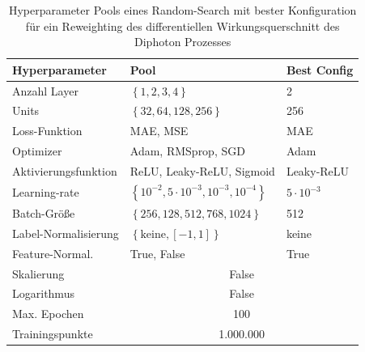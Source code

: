 \begin{table}
	\centering
	\begin{tabular}{|l|l|l|}
		\hline
		Hyperparameter & Pool & Best Config \\
		\hline
		Anzahl Layer & $\left\lbrace 1,2,3,4\right\rbrace$ & 2 \\
		Units &$\left\lbrace 32, 64, 128, 256\right\rbrace$ & 256 \\
		Loss-Funktion & MAE, MSE & MAE \\
		Optimizer & Adam, RMSprop, SGD  & Adam\\
		Aktivierungsfunktion & ReLU, Leaky-ReLU, Sigmoid & Leaky-ReLU \\
		Learning-rate & $\left\lbrace 10^{-2}, 5 \cdot 10^{-3}, 10^{-3}, 10^{-4} \right\rbrace $ & $5 \cdot 10^{-3}$\\
		Batch-Größe & $\left\lbrace 256, 128, 512, 768, 1024 \right\rbrace $ & 512\\
		Label-Normalisierung & $\left\lbrace \text{keine}, [-1,1]\right\rbrace $ & keine\\
		Feature-Normal. & True, False & True \\
		\hline
		Skalierung & \multicolumn{2}{c|}{False} \\
		Logarithmus & \multicolumn{2}{c|}{False} \\ 
		Max. Epochen & \multicolumn{2}{c|}{100}\\
		Trainingspunkte & \multicolumn{2}{c|}{1.000.000} \\
		\hline
	\end{tabular}
	\caption{Hyperparameter Pools eines Random-Search mit bester Konfiguration für ein Reweighting des differentiellen Wirkungsquerschnitt des Diphoton Prozesses}
	\label{hyperparameter-reweighting}
\end{table}
